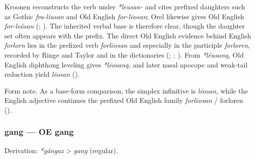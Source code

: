 \documentclass[
  british,
  a4paper,
]{article}
\begin{document}
Kroonen reconstructs the verb under \emph{*leusan-} and cites prefixed
daughters such as Gothic \emph{fra-liusan} and Old English
\emph{for-lēosan}; Orel likewise gives Old English \emph{for-leósan}
(;
). The inherited verbal base is
therefore clear, though the daughter set often appears with the prefix.
The direct Old English evidence behind English \emph{forlorn} lies in
the prefixed verb \emph{forlēosan} and especially in the participle
\emph{forloren}, recorded by Ringe and Taylor and in the dictionaries
(;
;
). From
\emph{*léusaną}, Old English diphthong leveling gives \emph{*lēosaną},
and later nasal apocope and weak-tail reduction yield \emph{lēosan}
().

Form note. As a base-form comparison, the simplex infinitive is
\emph{lēosan}, while the English adjective continues the prefixed Old
English family \emph{forlēosan} / forloren
().

\subsubsection{gang --- OE gang}\label{gang-oe-gang}

Derivation: \emph{*gángaz} \textgreater{} \emph{gang} (regular).

\begingroup
\setlength{\fboxsep}{6pt}
\end{document}
